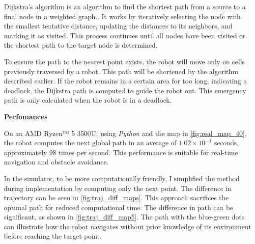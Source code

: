 \documentclass[../main.tex]{subfiles}
\begin{document}
Dijkstra's algorithm is an algorithm to find the shortest path from a source to a final node in a weighted graph.\cite{dijkstra_1959}. It works by iteratively selecting the node with the smallest tentative distance, updating the distances to its neighbors, and marking it as visited. This process continues until all nodes have been visited or the shortest path to the target node is determined.\cite{dijkstra_anim_wiki_2025}

To ensure the path to the nearest point exists, the robot will move only on cells previously traversed by a robot. This path will be shortened by the algorithm described earlier.
If the robot remains in a certain area for too long, indicating a deadlock, the Dijkstra path is computed to guide the robot out. This emergency path is only calculated when the robot is in a deadlock.

\textbf{Perfomances}

On an AMD Ryzen™ 5 3500U, using \textit{Python} and the map in \autoref{fig:real_map_40}, the robot computes the next global path in an average of $1.02 \times 10^{-1}$ seconds, approximately 98 times per second. This performance is suitable for real-time navigation and obstacle avoidance.

In the simulator, to be more computationally friendly, I simplified the method during implementation by computing only the next point. The difference in trajectory can be seen in \autoref{fig:traj_diff_maps}. This approach sacrifices the optimal path for reduced computational time. The difference in path can be significant, as shown in \autoref{fig:traj_diff_map5}. The path with the blue-green dots can illustrate how the robot navigates without prior knowledge of its environment before reaching the target point.
\end{document}
